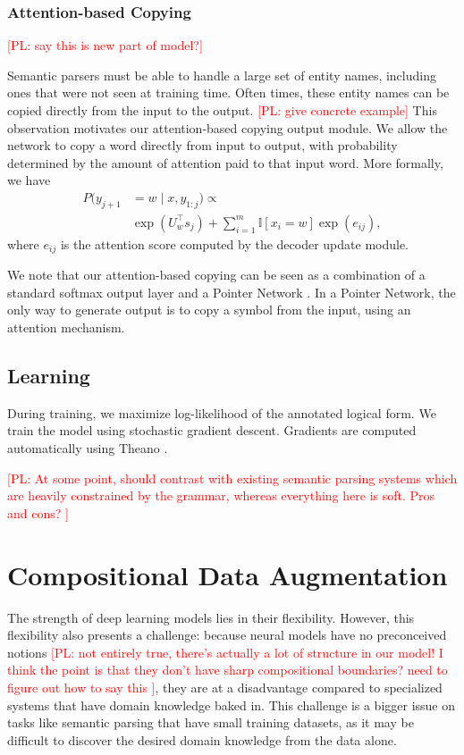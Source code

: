 \documentclass[11pt,letterpaper]{article}
\newcommand\pl[1]{\textcolor{red}{[PL: #1]}}
\begin{document}
\subsubsection{Attention-based Copying}
\pl{say this is new part of model?}

Semantic parsers must be able to handle a large set of entity names,
including ones that were not seen at training time.
Often times, these entity names
can be copied directly from the input to the output.
\pl{give concrete example}
This observation motivates our attention-based copying output module.
We allow the network to copy a word directly from input to output,
with probability determined by the amount of attention paid to that input word.
More formally, we have
\begin{align*}
  P(y_{j+1} &= w \mid x, y_{1:j}) \propto 
  \\ &\exp(U_{w}^\top s_j)
  + \sum_{i=1}^m \mathbb{I}[x_i = w] \exp(e_{ij}),
\end{align*}
where $e_{ij}$ is the attention score computed by the decoder update module.

We note that our attention-based copying can be seen as a 
combination of a standard softmax output layer
and a Pointer Network \cite{vinyals2015pointer}.  In a Pointer Network,
the only way to generate output is to copy a symbol from the input,
using an attention mechanism.

\subsection{Learning}
During training, we maximize log-likelihood of the annotated logical form.
We train the model using stochastic gradient descent.
Gradients are computed automatically using Theano \cite{bergstra2010theano}.

\pl{
  At some point, should contrast with existing semantic parsing systems
  which are heavily constrained by the grammar, whereas everything here is soft.
  Pros and cons?
}

\section{Compositional Data Augmentation}
The strength of deep learning models lies in their flexibility.
However, this flexibility also presents a challenge:
because neural models have no preconceived notions \pl{not entirely true,
there's actually a lot of structure in our model!
I think the point is that they don't have sharp compositional boundaries?
need to figure out how to say this
},
they are at a disadvantage compared to specialized systems
that have domain knowledge baked in.
This challenge is a bigger issue on tasks like semantic parsing
that have small training datasets, as
it may be difficult to discover the desired domain knowledge
from the data alone.
\end{document}
